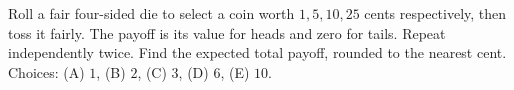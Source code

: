 Roll a fair four-sided die to select a coin worth $ 1,5,10,25 $ cents respectively, then toss it fairly. The payoff is its value for heads and zero for tails. Repeat independently twice. Find the expected total payoff, rounded to the nearest cent. Choices: (A) $ 1 $, (B) $ 2 $, (C) $ 3 $, (D) $ 6 $, (E) $ 10 $.
